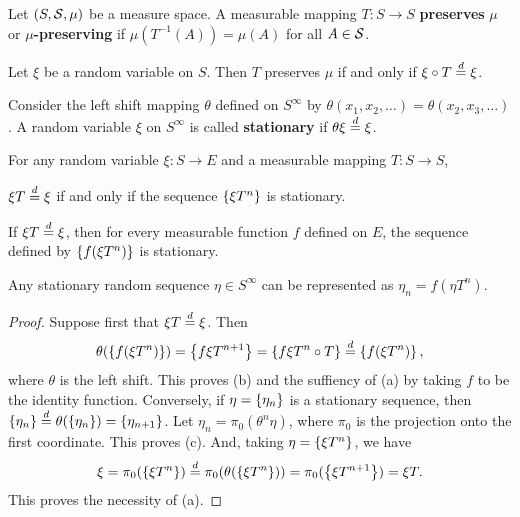 \begin{definition}
    Let $(S,\S,\mu)$ be a measure space. A measurable mapping
    $T:S\to S$ \textbf{preserves} $\mu$ or \textbf{$\mu$-preserving} 
    if $\mu(T^{-1}(A)) = \mu(A)$ for all $A\in\S$. 
\end{definition}

\begin{remark}
    Let $\xi$ be a random variable on $S$. Then $T$ preserves $\mu$ 
    if and only if $\xi\circ T\deq\xi$.
\end{remark} 

\begin{definition}
    Consider the left shift mapping $\theta$ defined on $S^\infty$ by 
    $\theta(x_1,x_2,\ldots) = \theta(x_2,x_3,\ldots)$. A random variable 
    $\xi$ on $S^\infty$ is called \textbf{stationary} if $\theta\xi\deq\xi$.
\end{definition}

\begin{lemma}\label{lem:stationary_invariance}
    For any random variable $\xi:S\to E$ and a measurable mapping 
    $T:S\to S$, 
    \begin{thmenum}
        \item $\xi T \deq \xi$ if and only if the sequence $\set{\xi T^n}$ is 
        stationary. 
        \item If $\xi T \deq \xi$, then for every measurable function 
        $f$ defined on $E$, the sequence defined by $\set{f(\xi T^n)}$ is stationary.
        \item Any stationary random sequence $\eta\in S^\infty$ can be represented as 
        $\eta_n = f(\eta T^n)$.
    \end{thmenum}
\end{lemma}
\begin{proof}
    Suppose first that $\xi T\deq\xi$. Then 
    \begin{equation*}
        \theta(\set{f(\xi T^n)}) = \set{f\xi T^{n+1}} = \set{f\xi T^n\circ T} \deq \set{f(\xi T^n)},
    \end{equation*}
    where $\theta$ is the left shift. This proves (b) and the suffiency 
    of (a) by taking $f$ to be the identity function. Conversely, if 
    $\eta = \set{\eta_n}$ is a stationary sequence, then $\set{\eta_n} \deq 
    \theta(\set{\eta_n}) = \set{\eta_{n+1}}$. Let $\eta_n = \pi_0(\theta^n\eta)$, 
    where $\pi_0$ is the projection onto the first coordinate. This 
    proves (c). And, taking $\eta = \set{\xi T^n}$, we have 
    \begin{equation*}
        \xi = \pi_0(\set{\xi T^n}) \deq \pi_0(\theta(\set{\xi T^n})) = \pi_0(\set{\xi T^{n+1}}) = \xi T.
    \end{equation*}
    This proves the necessity of (a).
\end{proof}

